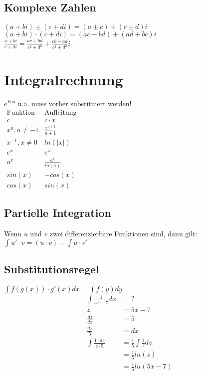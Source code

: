 \documentclass[a4paper, 10pt, landscape]{article}
\begin{document}
\begin{multicols}{5}
\begin{small}
        \subsection{Komplexe Zahlen}
	        $(a + bi) \pm (c + di) = (a \pm c) + (c \pm d)i$\\
	        $(a + bi) \cdot (c + di) = (ac - bd) + (ad + bc)i$\\
	        
            $\displaystyle \frac{a + bi}{c + di} = \frac{ac + bd}{c^2 + d^2} + \frac{cb - ad}{c^2 + d^2}i$
	\section{Integralrechnung}
	    $e^{Foo}$ u.ä. muss vorher substituiert werden!\\
        $\begin{matrix}
        \text{Funktion} & \text{Aufleitung} \\
        c & c \cdot x \\
        x^a, a \neq -1 & \frac{x^{a+1}}{a+1}\\
        x^{-1}, x \neq 0 & ln(|x|)\\
        e^x & e^x \\
        a^x & \frac{a^x}{ln(a)} \\
        sin(x) & -cos(x)\\
        cos(x) & sin(x)
        \end{matrix}
        $
        \subsection{Partielle Integration}
	        Wenn $u$ und $v$ zwei differenzierbare Funktionen sind, dann gilt: \\
	        $\int u' \cdot v = (u \cdot v) - \int u \cdot v'$
        \subsection{Substitutionsregel}
	        $\int f(g(x)) \cdot g'(x) dx = \int f(y) dy$
	        \begin{align*}
	            \int \frac{1}{5x - 7} dx &= ?\\
	            z &= 5x - 7 \\
	            \frac{dz}{dx} &= 5 \\   
	            \frac{dz}{5} &= dx  \\
	            \int \frac{1 \cdot dz}{z \cdot 5} &= \frac{1}{5} \int \frac{1}{z} dz \\
                &= \frac{1}{5} ln(z) \\
                &= \frac{1}{5} ln(5x-7)
	        \end{align*}

\end{small}
\end{multicols}
\end{document}

